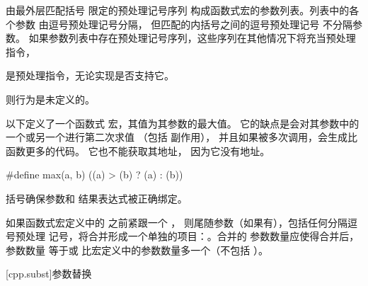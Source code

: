     \pnum
    由最外层匹配括号
    限定的预处理记号序列
    构成函数式宏的参数列表。列表中的各个参数
    由逗号预处理记号分隔，
    但匹配的内括号之间的逗号预处理记号
    不分隔参数。
    如果参数列表中存在预处理记号序列，这些序列在其他情况下将充当预处理指令，
    \begin{footnote}
     是预处理指令，无论实现是否支持它。
    \end{footnote}
    则行为是未定义的。
    
    \pnum
    \begin{example}
    以下定义了一个函数式
    宏，其值为其参数的最大值。
    它的缺点是会对其参数中的一个或另一个进行第二次求值
    （包括
    副作用），
    并且如果被多次调用，会生成比函数更多的代码。
    它也不能获取其地址，
    因为它没有地址。
    
    \begin{codeblock}
    #define max(a, b) ((a) > (b) ? (a) : (b))
    \end{codeblock}
    
    括号确保参数和
    结果表达式被正确绑定。
    \end{example}
    
    \pnum
    如果函数式宏定义中的 \tcode{)} 之前紧跟一个 ，
    则尾随参数（如果有），包括任何分隔逗号预处理
    记号，将合并形成一个单独的项目：。合并的
    参数数量应使得合并后，参数数量
    等于或
    比宏定义中的参数数量多一个（不包括
    ）。
    
    [cpp.subst]{参数替换}%
    
    \begin{bnf}
    \br
          \terminal{)}
    \end{bnf}
    
